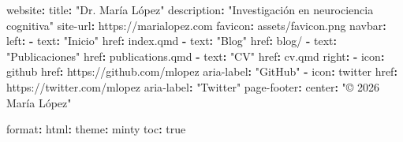 \documentclass[
  doc,
  floatsintext,
  longtable,
  a4paper,
  nolmodern,
  notxfonts,
  notimes,
  12pt,
  colorlinks=true,linkcolor=blue,citecolor=blue,urlcolor=blue]{apa7}
\newenvironment{Shaded}{\begin{snugshade}}{\end{snugshade}}
\newcommand{\AttributeTok}[1]{\textcolor[rgb]{0.40,0.45,0.13}{#1}}
\newcommand{\CharTok}[1]{\textcolor[rgb]{0.13,0.47,0.30}{#1}}
\newcommand{\FunctionTok}[1]{\textcolor[rgb]{0.28,0.35,0.67}{#1}}
\newcommand{\KeywordTok}[1]{\textcolor[rgb]{0.00,0.23,0.31}{\textbf{#1}}}
\newcommand{\StringTok}[1]{\textcolor[rgb]{0.13,0.47,0.30}{#1}}
\begin{document}
\begin{Shaded}
\begin{Highlighting}[]
\FunctionTok{website}\KeywordTok{:}
\AttributeTok{  }\FunctionTok{title}\KeywordTok{:}\AttributeTok{ }\StringTok{"Dr. María López"}
\AttributeTok{  }\FunctionTok{description}\KeywordTok{:}\AttributeTok{ }\StringTok{"Investigación en neurociencia cognitiva"}
\AttributeTok{  }\FunctionTok{site{-}url}\KeywordTok{:}\AttributeTok{ https://marialopez.com}
\AttributeTok{  }\FunctionTok{favicon}\KeywordTok{:}\AttributeTok{ assets/favicon.png}
\AttributeTok{  }
\AttributeTok{  }\FunctionTok{navbar}\KeywordTok{:}
\AttributeTok{    }\FunctionTok{left}\KeywordTok{:}
\AttributeTok{      }\KeywordTok{{-}}\AttributeTok{ }\FunctionTok{text}\KeywordTok{:}\AttributeTok{ }\StringTok{"Inicio"}
\AttributeTok{        }\FunctionTok{href}\KeywordTok{:}\AttributeTok{ index.qmd}
\AttributeTok{      }\KeywordTok{{-}}\AttributeTok{ }\FunctionTok{text}\KeywordTok{:}\AttributeTok{ }\StringTok{"Blog"}
\AttributeTok{        }\FunctionTok{href}\KeywordTok{:}\AttributeTok{ blog/}
\AttributeTok{      }\KeywordTok{{-}}\AttributeTok{ }\FunctionTok{text}\KeywordTok{:}\AttributeTok{ }\StringTok{"Publicaciones"}
\AttributeTok{        }\FunctionTok{href}\KeywordTok{:}\AttributeTok{ publications.qmd}
\AttributeTok{      }\KeywordTok{{-}}\AttributeTok{ }\FunctionTok{text}\KeywordTok{:}\AttributeTok{ }\StringTok{"CV"}
\AttributeTok{        }\FunctionTok{href}\KeywordTok{:}\AttributeTok{ cv.qmd}
\AttributeTok{    }\FunctionTok{right}\KeywordTok{:}
\AttributeTok{      }\KeywordTok{{-}}\AttributeTok{ }\FunctionTok{icon}\KeywordTok{:}\AttributeTok{ github}
\AttributeTok{        }\FunctionTok{href}\KeywordTok{:}\AttributeTok{ https://github.com/mlopez}
\AttributeTok{        }\FunctionTok{aria{-}label}\KeywordTok{:}\AttributeTok{ }\StringTok{"GitHub"}
\AttributeTok{      }\KeywordTok{{-}}\AttributeTok{ }\FunctionTok{icon}\KeywordTok{:}\AttributeTok{ twitter}
\AttributeTok{        }\FunctionTok{href}\KeywordTok{:}\AttributeTok{ https://twitter.com/mlopez}
\AttributeTok{        }\FunctionTok{aria{-}label}\KeywordTok{:}\AttributeTok{ }\StringTok{"Twitter"}
\AttributeTok{  }
\AttributeTok{  }\FunctionTok{page{-}footer}\KeywordTok{:}
\AttributeTok{    }\FunctionTok{center}\KeywordTok{:}\AttributeTok{ }\StringTok{"© 2026 María López"}

\FunctionTok{format}\KeywordTok{:}
\AttributeTok{  }\FunctionTok{html}\KeywordTok{:}
\AttributeTok{    }\FunctionTok{theme}\KeywordTok{:}\AttributeTok{ minty}
\AttributeTok{    }\FunctionTok{toc}\KeywordTok{:}\AttributeTok{ }\CharTok{true}
\end{Highlighting}
\end{Shaded}
\end{document}
